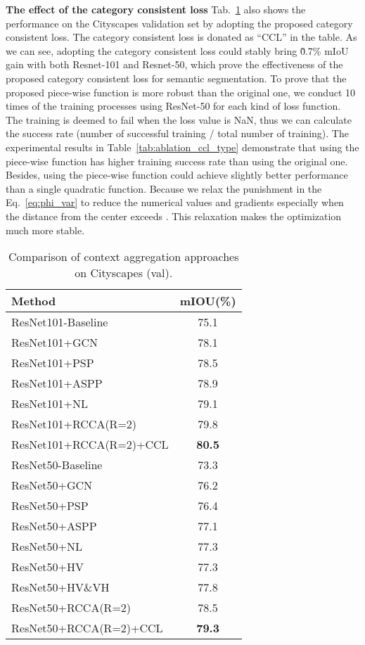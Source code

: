 \documentclass[10pt,journal,compsoc]{IEEEtran}
\newcommand{\red}[1]{#1}
\begin{document}
\noindent\textbf{The effect of the category consistent loss}
Tab.~\ref{tab:ablation_comparison} also shows the performance on the Cityscapes validation set by adopting the proposed category consistent loss. The category consistent loss is donated as ``CCL'' in the table. As we can see, adopting the category consistent loss could stably bring \~0.7\% mIoU gain with both Resnet-101 and Resnet-50, which prove the effectiveness of the proposed category consistent loss for semantic segmentation. \red{To prove that the proposed piece-wise function is more robust than the original one, we conduct 10 times of the training processes using ResNet-50 for each kind of loss function. The training is deemed to fail when the loss value is NaN, thus we can calculate the success rate (number of successful training / total number of training). The experimental results in Table~\ref{tab:ablation_ccl_type} demonstrate that using the piece-wise function has higher training success rate than using the original one. Besides, using the piece-wise function could achieve slightly better performance than a single quadratic function. Because we relax the punishment in the Eq.~\ref{eq:phi_var} to reduce the numerical values and gradients especially when the distance from the center exceeds . This relaxation makes the optimization much more stable. }


    \begin{table}[!t]
        \renewcommand{\arraystretch}{1.3}
        \setlength{\tabcolsep}{1.0em}
        \caption{Comparison of context aggregation approaches on Cityscapes (val).}
        \label{tab:ablation_comparison}
        \centering \small
        \begin{tabular}{|l|c|}
            \hline
            Method & mIOU(\%)  \\
            \hline
            ResNet101-Baseline & 75.1 \\
            ResNet101+GCN & 78.1 \\
            ResNet101+PSP & 78.5 \\
            ResNet101+ASPP & 78.9 \\
            ResNet101+NL & 79.1 \\
            ResNet101+RCCA(R=2)  & 79.8\\
            ResNet101+RCCA(R=2)+CCL  & \bf{80.5}\\
            \hline \hline
            ResNet50-Baseline & 73.3 \\
            ResNet50+GCN & 76.2 \\
            ResNet50+PSP & 76.4 \\
            ResNet50+ASPP & 77.1 \\
            ResNet50+NL & 77.3 \\
            ResNet50+HV & 77.3 \\
            ResNet50+HV\&VH & 77.8 \\
            ResNet50+RCCA(R=2)  & 78.5\\
            ResNet50+RCCA(R=2)+CCL  & \bf{79.3}\\
            \hline
        \end{tabular}
    \end{table}
    
\end{document}
